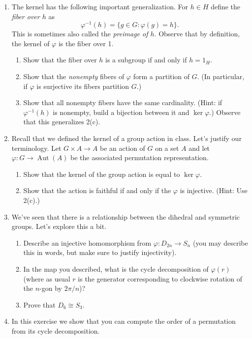 \documentclass[11pt]{article}
\begin{document}
\begin{enumerate}
\begin{enumerate}
  \end{enumerate}
  \item The kernel has the following important generalization.  For $h\in H$ define the \textit{fiber over $h$} as
  \[\varphi^{-1}(h) = \{g\in G:\varphi(g) = h\}.\]
  This is sometimes also called the \textit{preimage of $h$}.  Observe that by definition, the kernel of $\varphi$ is the fiber over 1.
  \begin{enumerate}
    \item{Show that the fiber over $h$ is a subgroup if and only if $h=1_H$.}
    \item{Show that the \textit{nonempty} fibers of $\varphi$ form a partition of $G$.  (In particular, if $\varphi$ is surjective its fibers partition $G$.)}
    \item{Show that all nonempty fibers have the same cardinality.  (Hint: if $\varphi^{-1}(h)$ is nonempty, build a bijection between it and $\ker\varphi$.)  Observe that this generalizes 2(c).}
  \end{enumerate}
  \item Recall that we defined the kernel of a group action in class.  Let's justify our terminology.  Let $G\times A\to A$ be an action of $G$ on a set $A$ and let $\varphi:G\to\operatorname{Aut}(A)$ be the associated permutation representation.
  \begin{enumerate}
    \item Show that the kernel of the group action is equal to $\ker\varphi$.
    \item Show that the action is faithful if and only if the $\varphi$ is injective.  (Hint: Use 2(c).)
  \end{enumerate}
  \item We've seen that there is a relationship between the dihedral and symmetric groups.  Let's explore this a bit.
  \begin{enumerate}
    \item Describe an injective homomorphism from $\varphi:D_{2n}\to S_n$ (you may describe this in words, but make sure to justify injectivity).
    \item In the map you described, what is the cycle decomposition of $\varphi(r)$ (where as usual $r$ is the generator corresponding to clockwise rotation of the $n$-gon by $2\pi/n$)?
    \item Prove that $D_6\cong S_3$.
  \end{enumerate}
  \item In this exercise we show that you can compute the order of a permutation from its cycle decomposition.

\end{enumerate}
\end{document}
